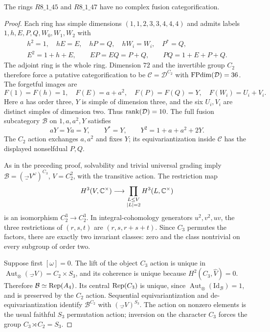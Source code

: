 \begin{proposition}\label{prop:dim72}
The rings $R8\_1\_45$ and $R8\_1\_47$ have no complex fusion categorification.
\end{proposition}
\begin{proof}
Each ring has simple dimensions $(1,1,2,3,3,4,4,4)$ and admits labels $1,h,E,P,Q,W_0,W_1,W_2$ with
\[
\begin{gathered}
h^2=1,\quad hE=E,\quad hP=Q,\quad hW_i=W_i,\quad P^*=Q,\\
E^2=1+h+E,\qquad EP=EQ=P+Q,\qquad PQ=1+E+P+Q.
\end{gathered}
\]
The adjoint ring is the whole ring. Dimension $72$ and the invertible group $C_2$ therefore force a putative categorification to be $\mathcal C=\mathcal D^{C_2}$ with $\operatorname{FPdim}(\mathcal D)=36$. The forgetful images are
\[
F(1)=F(h)=1,\quad F(E)=a+a^2,\quad F(P)=F(Q)=Y,
\quad F(W_i)=U_i+V_i.
\]
Here $a$ has order three, $Y$ is simple of dimension three, and the six $U_i,V_i$ are distinct simples of dimension two. Thus $\operatorname{rank}(\mathcal D)=10$. The full fusion subcategory $\mathcal B$ on $1,a,a^2,Y$ satisfies
\[
aY=Ya=Y,\qquad Y^*=Y,\qquad Y^2=1+a+a^2+2Y.
\]
The $C_2$ action exchanges $a,a^2$ and fixes $Y$; its equivariantization inside $\mathcal C$ has the displayed nonselfdual $P,Q$.

As in the preceding proof, solvability and trivial universal grading imply
$\mathcal B=(\Vec_V^\omega)^{C_3}$, $V=C_2^2$, with the transitive action. The restriction map
\[
H^3(V,\mathbb C^\times)\longrightarrow
\prod_{\substack{L\le V\\|L|=2}}H^3(L,\mathbb C^\times)
\]
is an isomorphism $C_2^3\to C_2^3$. In integral-cohomology generators $u^2,v^2,uv$, the three restrictions of $(r,s,t)$ are $(r,s,r+s+t)$. Since $C_3$ permutes the factors, there are exactly two invariant classes: zero and the class nontrivial on every subgroup of order two.

Suppose first $[\omega]=0$. The lift of the object $C_3$ action is unique in $\operatorname{Aut}_{\otimes}(\Vec_V)=C_2\times S_3$, and its coherence is unique because $H^2(C_3,\widehat V)=0$. Therefore $\mathcal B\simeq\operatorname{Rep}(A_4)$. Its central $\operatorname{Rep}(C_3)$ is unique, since $\operatorname{Aut}_{\otimes}(\mathrm{Id}_{\mathcal B})=1$, and is preserved by the $C_2$ action. Sequential equivariantization and de-equivariantization \cite[Section~2.6 and Proposition~2.10]{ENOSolvable}\cite[Proposition~4.19]{DGNO} identify $\mathcal B^{C_2}$ with $(\Vec_V)^{S_3}$. The action on nonzero elements is the usual faithful $S_3$ permutation action; inversion on the character $C_3$ forces the group $C_3\rtimes C_2=S_3$.


\end{proof}
